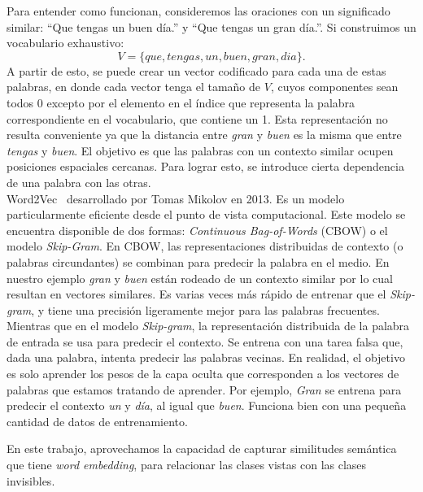 Para entender como funcionan, consideremos las oraciones con un significado similar: ``Que tengas un buen día.'' y ``Que tengas un gran día.''. Si construimos un vocabulario exhaustivo:
 \[ V = \{que, tengas, un, buen, gran, dia\}. \]
A partir de esto, se puede crear un vector codificado para cada una de estas palabras, en donde cada vector tenga el tamaño de $V$, cuyos componentes sean todos 0 excepto por el elemento en el índice que representa la palabra correspondiente en el vocabulario, que contiene un 1. Esta representación no resulta conveniente ya que la distancia entre \textit{gran} y \textit{buen} es la misma que entre \textit{tengas} y \textit{buen}.  El objetivo es que las palabras con un contexto similar ocupen posiciones espaciales cercanas. Para lograr esto, se introduce cierta dependencia de una palabra con las otras.\\

Word2Vec~\cite{mikolov2013distributed} desarrollado por Tomas Mikolov en 2013. Es un modelo particularmente eficiente desde el punto de vista computacional. Este modelo se encuentra disponible de dos formas: \textit{Continuous Bag-of-Words} (CBOW) o el modelo \textit{Skip-Gram}. En CBOW, las representaciones distribuidas de contexto (o palabras circundantes) se combinan para predecir la palabra en el medio. En nuestro ejemplo \textit{gran} y \textit{buen} están rodeado de un contexto similar por lo cual resultan en vectores similares. Es varias veces más rápido de entrenar que el \textit{Skip-gram}, y tiene una precisión ligeramente mejor para las palabras frecuentes. Mientras que en el modelo \textit{Skip-gram}, la representación distribuida de la palabra de entrada se usa para predecir el contexto. Se entrena con una tarea falsa que, dada una palabra, intenta predecir las palabras vecinas. En realidad, el objetivo es solo aprender los pesos de la capa oculta que corresponden a los vectores de palabras que estamos tratando de aprender. Por ejemplo, \textit{Gran} se entrena para predecir el contexto \textit{un} y  \textit{día}, al igual que \textit{buen}. Funciona bien con una pequeña cantidad de datos de entrenamiento.

En este trabajo, aprovechamos la capacidad de capturar similitudes semántica que tiene \textit{word embedding}, para relacionar las clases vistas con las clases invisibles.\\


